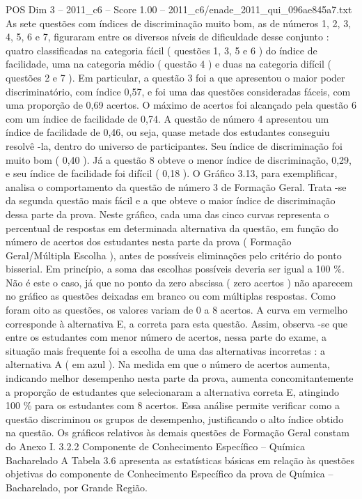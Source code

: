 \begin{textsample}{POS Dim 3 – 2011\_c6 – Score 1.00 – 2011\_c6/enade\_2011\_qui\_096ae845a7.txt}
As sete questões com índices de discriminação muito bom, as de números 1, 2, 3, 4, 5, 6 e 7, figuraram entre os diversos níveis de dificuldade desse conjunto : quatro classificadas na categoria fácil ( questões 1, 3, 5 e 6 ) do índice de facilidade, uma na categoria médio ( questão 4 ) e duas na categoria difícil ( questões 2 e 7 ).
Em particular, a questão 3 foi a que apresentou o maior poder discriminatório, com índice 0,57, e foi uma das questões consideradas fáceis, com uma proporção de 0,69 acertos.
O máximo de acertos foi alcançado pela questão 6 com um índice de facilidade de 0,74.
A questão de número 4 apresentou um índice de facilidade de 0,46, ou seja, quase metade dos estudantes conseguiu resolvê -la, dentro do universo de participantes.
Seu índice de discriminação foi muito bom ( 0,40 ).
Já a questão 8 obteve o menor índice de discriminação, 0,29, e seu índice de facilidade foi difícil ( 0,18 ).
O Gráfico 3.13, para exemplificar, analisa o comportamento da questão de número 3 de Formação Geral.
Trata -se da segunda questão mais fácil e a que obteve o maior índice de discriminação dessa parte da prova.
Neste gráfico, cada uma das cinco curvas representa o percentual de respostas em determinada alternativa da questão, em função do número de acertos dos estudantes nesta parte da prova ( Formação Geral/Múltipla Escolha ), antes de possíveis eliminações pelo critério do ponto bisserial.
Em princípio, a soma das escolhas possíveis deveria ser igual a 100 \%.
Não é este o caso, já que no ponto da zero abscissa ( zero acertos ) não aparecem no gráfico as questões deixadas em branco ou com múltiplas respostas.
Como foram oito as questões, os valores variam de 0 a 8 acertos.
A curva em vermelho corresponde à alternativa E, a correta para esta questão.
Assim, observa -se que entre os estudantes com menor número de acertos, nessa parte do exame, a situação mais frequente foi a escolha de uma das alternativas incorretas : a alternativa A ( em azul ).
Na medida em que o número de acertos aumenta, indicando melhor desempenho nesta parte da prova, aumenta concomitantemente a proporção de estudantes que selecionaram a alternativa correta E, atingindo 100 \% para os estudantes com 8 acertos.
Essa análise permite verificar como a questão discriminou os grupos de desempenho, justificando o alto índice obtido na questão.
Os gráficos relativos às demais questões de Formação Geral constam do Anexo I. 3.2.2 Componente de Conhecimento Específico – Química Bacharelado A Tabela 3.6 apresenta as estatísticas básicas em relação às questões objetivas do componente de Conhecimento Específico da prova de Química – Bacharelado, por Grande Região.

\end{textsample}

